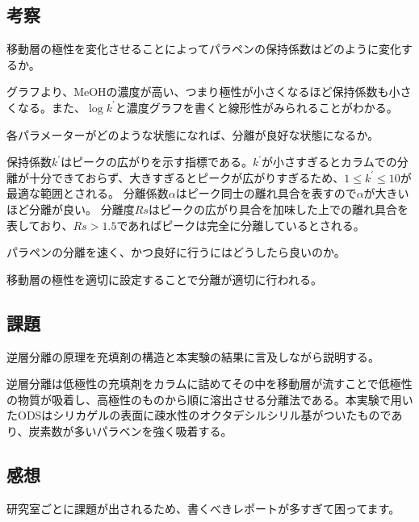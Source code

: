 \documentclass[a4paper,papersize,dvipdfmx]{jsarticle}
\begin{document}
\subsection*{考察}

\begin{tcolorbox}[colback=white,colbacktitle=black!10!white,coltitle=black,title={1}]
移動層の極性を変化させることによってパラペンの保持係数はどのように変化するか。
\end{tcolorbox}

グラフより、MeOHの濃度が高い、つまり極性が小さくなるほど保持係数も小さくなる。また、$\log k^\prime$と濃度グラフを書くと線形性がみられることがわかる。

\begin{tcolorbox}[colback=white,colbacktitle=black!10!white,coltitle=black,title={2}]
各パラメーターがどのような状態になれば、分離が良好な状態になるか。
\end{tcolorbox}

保持係数$k^\prime$はピークの広がりを示す指標である。$k^\prime$が小さすぎるとカラムでの分離が十分できておらず、大きすぎるとピークが広がりすぎるため、$1 \leq k^\prime \leq 10$が最適な範囲とされる。
分離係数$\alpha$はピーク同士の離れ具合を表すので$\alpha$が大きいほど分離が良い。
分離度$Rs$はピークの広がり具合を加味した上での離れ具合を表しており、$Rs > 1.5$であればピークは完全に分離しているとされる。

\begin{tcolorbox}[colback=white,colbacktitle=black!10!white,coltitle=black,title={3}]
パラペンの分離を速く、かつ良好に行うにはどうしたら良いのか。
\end{tcolorbox}

移動層の極性を適切に設定することで分離が適切に行われる。

\subsection*{課題}
\begin{tcolorbox}[colback=white,colbacktitle=black!10!white,coltitle=black]
逆層分離の原理を充填剤の構造と本実験の結果に言及しながら説明する。
\end{tcolorbox}

逆層分離は低極性の充填剤をカラムに詰めてその中を移動層が流すことで低極性の物質が吸着し、高極性のものから順に溶出させる分離法である。本実験で用いたODSはシリカゲルの表面に疎水性のオクタデシルシリル基がついたものであり、炭素数が多いパラベンを強く吸着する。

\subsection*{感想}
研究室ごとに課題が出されるため、書くべきレポートが多すぎて困ってます。
\end{document}
